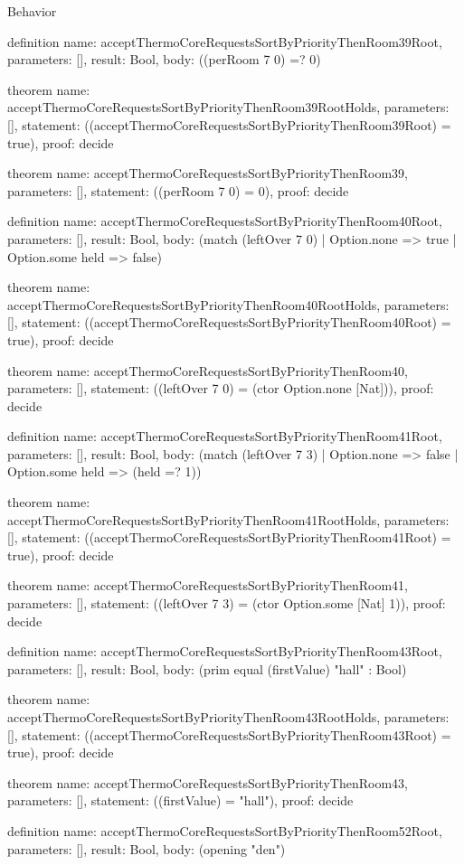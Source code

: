 \begin{lexlean}{Behavior}
\begin{semanticmodule}
definition{
  name: acceptThermoCoreRequestsSortByPriorityThenRoom39Root,
  parameters: [],
  result: Bool,
  body: ((perRoom 7 0) =? 0)
}

theorem{
  name: acceptThermoCoreRequestsSortByPriorityThenRoom39RootHolds,
  parameters: [],
  statement: ((acceptThermoCoreRequestsSortByPriorityThenRoom39Root) = true),
  proof: decide{}
}

theorem{
  name: acceptThermoCoreRequestsSortByPriorityThenRoom39,
  parameters: [],
  statement: ((perRoom 7 0) = 0),
  proof: decide{}
}

definition{
  name: acceptThermoCoreRequestsSortByPriorityThenRoom40Root,
  parameters: [],
  result: Bool,
  body: (match (leftOver 7 0) | Option.none => true | Option.some held => false)
}

theorem{
  name: acceptThermoCoreRequestsSortByPriorityThenRoom40RootHolds,
  parameters: [],
  statement: ((acceptThermoCoreRequestsSortByPriorityThenRoom40Root) = true),
  proof: decide{}
}

theorem{
  name: acceptThermoCoreRequestsSortByPriorityThenRoom40,
  parameters: [],
  statement: ((leftOver 7 0) = (ctor Option.none [Nat])),
  proof: decide{}
}

definition{
  name: acceptThermoCoreRequestsSortByPriorityThenRoom41Root,
  parameters: [],
  result: Bool,
  body: (match (leftOver 7 3) | Option.none => false | Option.some held => (held =? 1))
}

theorem{
  name: acceptThermoCoreRequestsSortByPriorityThenRoom41RootHolds,
  parameters: [],
  statement: ((acceptThermoCoreRequestsSortByPriorityThenRoom41Root) = true),
  proof: decide{}
}

theorem{
  name: acceptThermoCoreRequestsSortByPriorityThenRoom41,
  parameters: [],
  statement: ((leftOver 7 3) = (ctor Option.some [Nat] 1)),
  proof: decide{}
}

definition{
  name: acceptThermoCoreRequestsSortByPriorityThenRoom43Root,
  parameters: [],
  result: Bool,
  body: (prim equal (firstValue) "hall" : Bool)
}

theorem{
  name: acceptThermoCoreRequestsSortByPriorityThenRoom43RootHolds,
  parameters: [],
  statement: ((acceptThermoCoreRequestsSortByPriorityThenRoom43Root) = true),
  proof: decide{}
}

theorem{
  name: acceptThermoCoreRequestsSortByPriorityThenRoom43,
  parameters: [],
  statement: ((firstValue) = "hall"),
  proof: decide{}
}

definition{
  name: acceptThermoCoreRequestsSortByPriorityThenRoom52Root,
  parameters: [],
  result: Bool,
  body: (opening "den")
}


\end{semanticmodule}
\end{lexlean}
